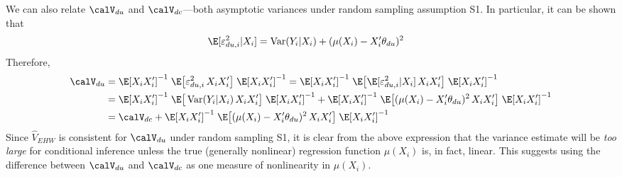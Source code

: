 \documentclass[12pt]{article}
\theoremstyle{plain}
\theoremstyle{definition}
\theoremstyle{remark}
\newcommand{\Var}{\operatorname{Var}}
\begin{document}
\begin{enumerate}
    We can also relate $\calV_{du}$ and $\calV_{dc}$---both asymptotic
    variances under random sampling assumption S1.
    In particular, it can be shown that
    \begin{align*}
      \E[\varepsilon^2_{du,i}|X_i]
      &=
      \Var(Y_i|X_i) + (\mu(X_i)-X_i'{\theta}_{du})^2
    \end{align*}
    Therefore,
    \begin{align*}
      \calV_{du}
      &=
      \E[X_iX_i']^{-1}
      \;
      \E\big[\varepsilon^2_{du,i}\,X_iX_i'\big]
      \;
      \E[X_iX_i']^{-1}
      =
      \E[X_iX_i']^{-1}
      \;
      \E\big[\E[\varepsilon^2_{du,i}|X_i]\,X_iX_i'\big]
      \;
      \E[X_iX_i']^{-1}
      \\
      &=
      \E[X_iX_i']^{-1}
      \;
      \E\big[\Var(Y_i|X_i)\,X_iX_i'\big]
      \;
      \E[X_iX_i']^{-1}
      +
      \E[X_iX_i']^{-1}
      \;
      \E\big[(\mu(X_i)-X_i'\theta_{du})^2\,X_iX_i'\big]
      \;
      \E[X_iX_i']^{-1}
      \\
      &=
      \calV_{dc}
      +
      \E[X_iX_i']^{-1}
      \;
      \E\big[(\mu(X_i)-X_i'\theta_{du})^2\,X_iX_i'\big]
      \;
      \E[X_iX_i']^{-1}
    \end{align*}
    Since $\hat{V}_{EHW}$ is consistent for $\calV_{du}$ under random
    sampling S1, it is clear from the above expression that
    the variance estimate will be \emph{too large} for conditional
    inference unless the true (generally nonlinear) regression function
    $\mu(X_i)$ is, in fact, linear.
    This suggests using the difference between $\calV_{du}$ and
    $\calV_{dc}$ as one measure of nonlinearity in $\mu(X_i)$.


\end{enumerate}
\end{document}
